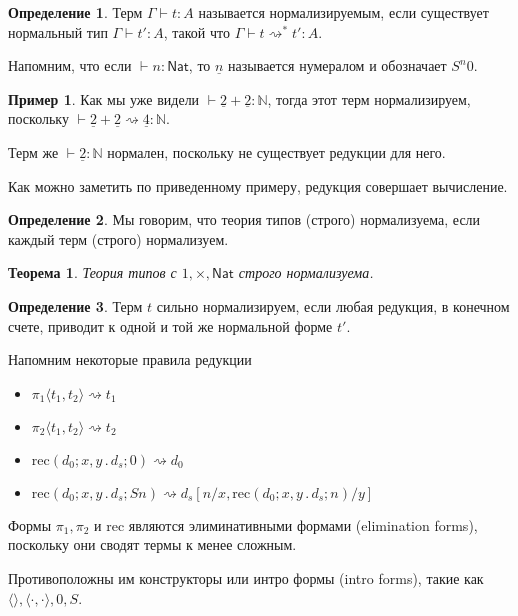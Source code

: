 \documentclass[openany]{book}
\theoremstyle{plain}
\newtheorem{thm}{Теорема}[section]
\theoremstyle{definition}
\newtheorem{defn}{Определение}[section]
\newtheorem{eg}{Пример}[]
\newcommand{\N}{\mathbb{N}}
\newcommand{\rec}{\mathrm{rec}}
\newcommand{\nat}{\mathsf{Nat}}
\begin{document}
\begin{defn}
    Терм \(\Gamma \vdash t: A\) называется нормализируемым, если существует нормальный тип \(\Gamma \vdash t' : A\), такой что \(\Gamma \vdash t \rightsquigarrow^* t' : A\).
\end{defn}

Напомним, что если \(\vdash n : \nat\), то \(\underline{n}\) называется нумералом и обозначает \(S^n 0\).

\begin{eg}
    Как мы уже видели \(\vdash \underline{2} + \underline{2} : \N\), тогда этот терм нормализируем, поскольку \(\vdash \underline{2} + \underline{2} \rightsquigarrow \underline{4} : \N\).

    Терм же \(\vdash \underline{2} : \N\) нормален, поскольку не существует редукции для него.
\end{eg}

Как можно заметить по приведенному примеру, редукция совершает вычисление.

\begin{defn}
    Мы говорим, что теория типов (строго) нормализуема, если каждый терм (строго) нормализуем.
\end{defn}

\begin{thm}
    Теория типов с \(1, \times, \nat\) строго нормализуема.
\end{thm}

\begin{defn}
    Терм \(t\) сильно нормализируем, если любая редукция, в конечном счете, приводит к одной и той же нормальной форме \(t'\).
\end{defn}

Напомним некоторые правила редукции
\begin{itemize}
    \item \(\pi_1 \langle t_1, t_2 \rangle \rightsquigarrow t_1\)
    \item \(\pi_2 \langle t_1, t_2 \rangle \rightsquigarrow t_2\)
    \item \(\rec(d_0; x, y\,.\, d_s; 0) \rightsquigarrow d_0\)
    \item \(\rec(d_0; x, y\,.\, d_s; Sn) \rightsquigarrow d_s [n/x, \rec(d_0; x, y\,.\, d_s; n)/y]\)
\end{itemize}

Формы \(\pi_1, \pi_2\) и \(\rec\) являются элиминативными формами (elimination forms), поскольку они сводят термы к менее сложным.

Противоположны им конструкторы или интро формы (intro forms), такие как \(\langle\rangle, \langle\cdot,\cdot\rangle, 0, S\).
\end{document}
